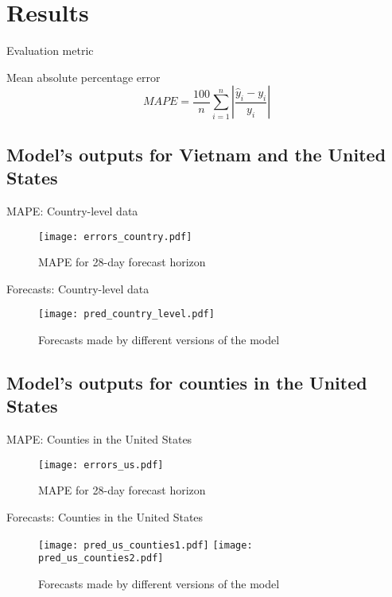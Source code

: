\section{Results}

\begin{frame}{Evaluation metric}
    \begin{block}{Mean absolute percentage error}
        \begin{equation*}
            MAPE = \frac{100}{n} \sum_{i=1}^n \left| \frac{\hat{y}_i - y_i}{y_i} \right|
        \end{equation*}
    \end{block}
\end{frame}

\subsection{Model's outputs for Vietnam and the United States}

\begin{frame}{MAPE: Country-level data}
    \begin{figure}[h]
        \centering
        \texttt{[image: errors\_country.pdf]}
        \caption{MAPE for 28-day forecast horizon}
    \end{figure}
\end{frame}

\begin{frame}{Forecasts: Country-level data}
    \begin{figure}[!htb]
        \centering
        \texttt{[image: pred\_country\_level.pdf]}
        \caption{Forecasts made by different versions of the model}
    \end{figure}
\end{frame}

\subsection{Model's outputs for counties in the United States}

\begin{frame}{MAPE: Counties in the United States}
    \begin{figure}[h]
        \centering
        \texttt{[image: errors\_us.pdf]}
        \caption{MAPE for 28-day forecast horizon}
    \end{figure}
\end{frame}

\begin{frame}{Forecasts: Counties in the United States}
    \begin{figure}[!htb]
        \centering
        \texttt{[image: pred\_us\_counties1.pdf]}
        \texttt{[image: pred\_us\_counties2.pdf]}
        \caption{Forecasts made by different versions of the model}
    \end{figure}
\end{frame}

